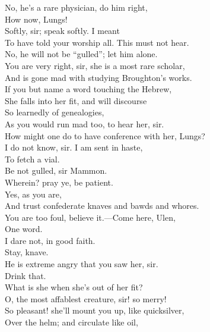 \documentclass[a4paper,oneside,12pt]{memoir}
\begin{document}
\begin{drama*}
No, he's a rare physician, do him right,\\
How now, Lungs!\\
\facespeaks {} Softly, sir; speak softly. I meant\\
To have told your worship all. This must not hear.\\
\mammonspeaks No, he will not be ``gulled''; let him alone.\\
\facespeaks You are very right, sir, she is a most rare scholar,\\
And is gone mad with studying Broughton's works.\\
If you but name a word touching the Hebrew,\\
She falls into her fit, and will discourse\\
So learnedly of genealogies,\\
As you would run mad too, to hear her, sir.\\
\mammonspeaks How might one do to have conference with her, Lungs?\\
\facespeaks I do not know, sir. I am sent in haste,\\
To fetch a vial.\\
\surlyspeaks {} Be not gulled, sir Mammon.\\
\mammonspeaks Wherein? pray ye, be patient.\\
\surlyspeaks {} Yes, as you are,\\
And trust confederate knaves and bawds and whores.\\
\mammonspeaks You are too foul, believe it.---Come here, Ulen,\\
One word.\\
\facespeaks {} I dare not, in good faith.\\
\mammonspeaks {} Stay, knave.\\
\facespeaks He is extreme angry that you saw her, sir.\\
\mammonspeaks Drink that.\\
 What is she when she's out of her fit?\\
\facespeaks O, the most affablest creature, sir! so merry!\\
So pleasant! she'll mount you up, like quicksilver,\\
Over the helm; and circulate like oil,\\

\end{drama*}
\end{document}
